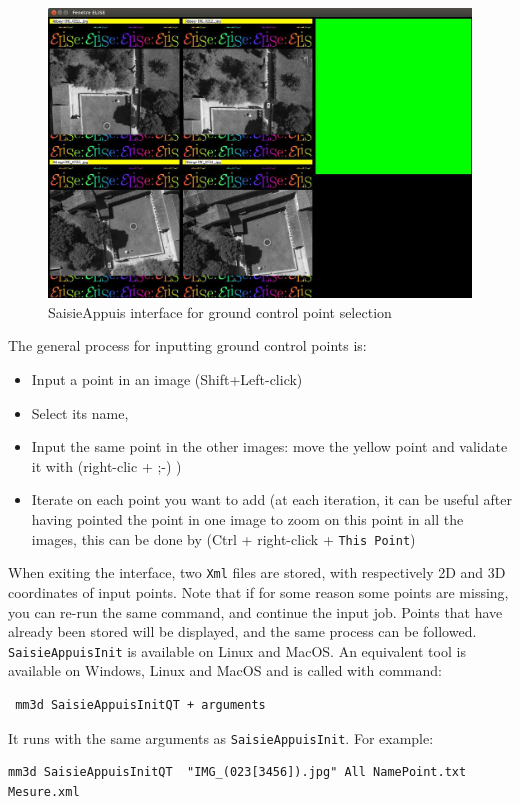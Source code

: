 \begin{figure}[H]
\begin{center}
\includegraphics[width=160mm]{FIGS/Saisie/interface.jpg}
\end{center}
\caption{SaisieAppuis interface for ground control point selection}
\label{FIG:SaisieAppuis:interface}
\end{figure}

The general process for inputting ground control points is:
\begin{itemize}
\item Input a point in an image (Shift+Left-click)
\item Select its name,
\item Input the same point in the other images: move the yellow point and validate it with (right-clic + ;-) )
\item Iterate on each point you want to add (at each iteration, it can be useful after having pointed the point in one image to zoom on this point in all the images,
this can be done by (Ctrl + right-click + {\tt This Point})
\end{itemize}

When exiting the interface, two {\tt Xml} files are stored, with respectively 2D and 3D coordinates of input points.
Note that if for some reason some points are missing, you can re-run the same command, and continue the input job.
Points that have already been stored will be displayed, and the same process can be followed.\\

{\tt SaisieAppuisInit} is available on Linux and MacOS.
An equivalent tool is available on Windows, Linux and MacOS and is called with command: \begin{verbatim} mm3d SaisieAppuisInitQT + arguments \end{verbatim}
It runs with the same arguments as {\tt SaisieAppuisInit}. For example:
\begin{verbatim}
mm3d SaisieAppuisInitQT  "IMG_(023[3456]).jpg" All NamePoint.txt  Mesure.xml
\end{verbatim}

